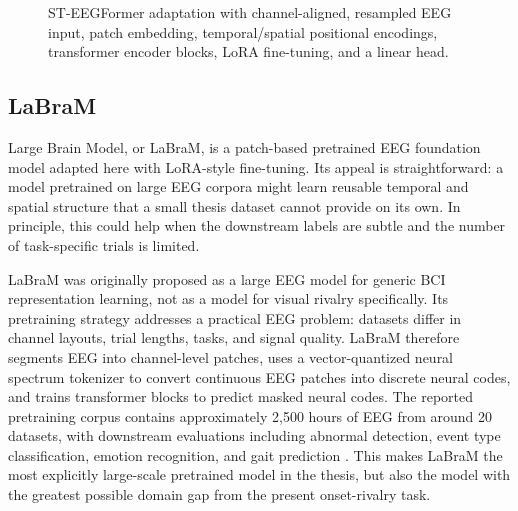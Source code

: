 \documentclass[11pt,a4paper,chapterprefix=false,parskip=false]{scrreprt}
\begin{document}
\begin{figure}[H]
{
    }
    \caption{ST-EEGFormer adaptation with channel-aligned, resampled EEG input, patch embedding, temporal/spatial positional encodings, transformer encoder blocks, LoRA fine-tuning, and a linear head.}
    \label{fig:steegformer-architecture}
\end{figure}

\subsection{LaBraM}
Large Brain Model, or LaBraM, is a patch-based pretrained EEG foundation model adapted here with LoRA-style fine-tuning. Its appeal is straightforward: a model pretrained on large EEG corpora might learn reusable temporal and spatial structure that a small thesis dataset cannot provide on its own. In principle, this could help when the downstream labels are subtle and the number of task-specific trials is limited.

LaBraM was originally proposed as a large EEG model for generic BCI representation learning, not as a model for visual rivalry specifically. Its pretraining strategy addresses a practical EEG problem: datasets differ in channel layouts, trial lengths, tasks, and signal quality. LaBraM therefore segments EEG into channel-level patches, uses a vector-quantized neural spectrum tokenizer to convert continuous EEG patches into discrete neural codes, and trains transformer blocks to predict masked neural codes. The reported pretraining corpus contains approximately 2,500 hours of EEG from around 20 datasets, with downstream evaluations including abnormal detection, event type classification, emotion recognition, and gait prediction \citep{jiang_large_2024}. This makes LaBraM the most explicitly large-scale pretrained model in the thesis, but also the model with the greatest possible domain gap from the present onset-rivalry task.
\end{document}
